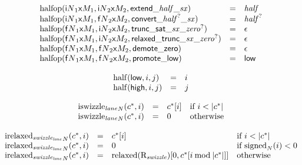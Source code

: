 $$
\begin{array}[t]{@{}lcl@{}l@{}}
{\mathrm{halfop}}({{{\mathsf{i}}{N}}_1}{\mathsf{x}}{M_1}, {{{\mathsf{i}}{N}}_2}{\mathsf{x}}{M_2}, {\mathsf{extend}}{\mathsf{\_}}{{\mathit{half}}}{\mathsf{\_}}{{\mathit{sx}}}) & = & {\mathit{half}} \\
{\mathrm{halfop}}({{{\mathsf{i}}{N}}_1}{\mathsf{x}}{M_1}, {{{\mathsf{f}}{N}}_2}{\mathsf{x}}{M_2}, {\mathsf{convert}}{\mathsf{\_}}{{{\mathit{half}}^?}}{\mathsf{\_}}{{\mathit{sx}}}) & = & {{\mathit{half}}^?} \\
{\mathrm{halfop}}({{{\mathsf{f}}{N}}_1}{\mathsf{x}}{M_1}, {{{\mathsf{i}}{N}}_2}{\mathsf{x}}{M_2}, {\mathsf{trunc\_sat}}{\mathsf{\_}}{{\mathit{sx}}}{\mathsf{\_}}{{{\mathit{zero}}^?}}) & = & \epsilon \\
{\mathrm{halfop}}({{{\mathsf{f}}{N}}_1}{\mathsf{x}}{M_1}, {{{\mathsf{i}}{N}}_2}{\mathsf{x}}{M_2}, {\mathsf{relaxed\_trunc}}{\mathsf{\_}}{{\mathit{sx}}}{\mathsf{\_}}{{{\mathit{zero}}^?}}) & = & \epsilon \\
{\mathrm{halfop}}({{{\mathsf{f}}{N}}_1}{\mathsf{x}}{M_1}, {{{\mathsf{f}}{N}}_2}{\mathsf{x}}{M_2}, {\mathsf{demote}}{\mathsf{\_}}{\mathsf{zero}}) & = & \epsilon \\
{\mathrm{halfop}}({{{\mathsf{f}}{N}}_1}{\mathsf{x}}{M_1}, {{{\mathsf{f}}{N}}_2}{\mathsf{x}}{M_2}, {\mathsf{promote}}{\mathsf{\_}}{\mathsf{low}}) & = & \mathsf{low} \\
\end{array}
$$

$$
\begin{array}[t]{@{}lcl@{}l@{}}
{\mathrm{half}}(\mathsf{low}, i, j) & = & i \\
{\mathrm{half}}(\mathsf{high}, i, j) & = & j \\
\end{array}
$$

\vspace{1ex}

$$
\begin{array}[t]{@{}lcl@{}l@{}}
{{\mathrm{iswizzle}}_{{\mathit{lane}}}}_{N}({c^\ast}, i) & = & {c^\ast}{}[i] & \quad \mbox{if}~ i < {|{c^\ast}|} \\
{{\mathrm{iswizzle}}_{{\mathit{lane}}}}_{N}({c^\ast}, i) & = & 0 & \quad \mbox{otherwise} \\
\end{array}
$$

$$
\begin{array}[t]{@{}lcl@{}l@{}}
{{\mathrm{irelaxed}}_{{\mathit{swizzle}}_{{\mathit{lane}}}}}_{N}({c^\ast}, i) & = & {c^\ast}{}[i] & \quad \mbox{if}~ i < {|{c^\ast}|} \\
{{\mathrm{irelaxed}}_{{\mathit{swizzle}}_{{\mathit{lane}}}}}_{N}({c^\ast}, i) & = & 0 & \quad \mbox{if}~ {{\mathrm{signed}}}_{N}(i) < 0 \\
{{\mathrm{irelaxed}}_{{\mathit{swizzle}}_{{\mathit{lane}}}}}_{N}({c^\ast}, i) & = & {{\mathrm{relaxed}}({\mathrm{R}}_{\mathit{swizzle}})}{{}[ 0, {c^\ast}{}[i \mathbin{\mathrm{mod}} {|{c^\ast}|}] ]} & \quad \mbox{otherwise} \\
\end{array}
$$

